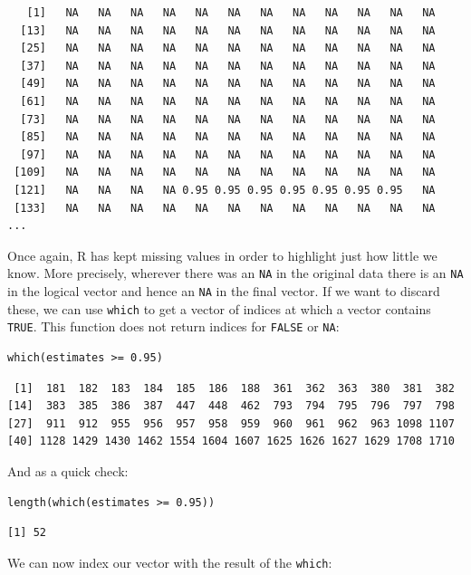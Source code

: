\begin{lstlisting}
   [1]   NA   NA   NA   NA   NA   NA   NA   NA   NA   NA   NA   NA
  [13]   NA   NA   NA   NA   NA   NA   NA   NA   NA   NA   NA   NA
  [25]   NA   NA   NA   NA   NA   NA   NA   NA   NA   NA   NA   NA
  [37]   NA   NA   NA   NA   NA   NA   NA   NA   NA   NA   NA   NA
  [49]   NA   NA   NA   NA   NA   NA   NA   NA   NA   NA   NA   NA
  [61]   NA   NA   NA   NA   NA   NA   NA   NA   NA   NA   NA   NA
  [73]   NA   NA   NA   NA   NA   NA   NA   NA   NA   NA   NA   NA
  [85]   NA   NA   NA   NA   NA   NA   NA   NA   NA   NA   NA   NA
  [97]   NA   NA   NA   NA   NA   NA   NA   NA   NA   NA   NA   NA
 [109]   NA   NA   NA   NA   NA   NA   NA   NA   NA   NA   NA   NA
 [121]   NA   NA   NA   NA 0.95 0.95 0.95 0.95 0.95 0.95 0.95   NA
 [133]   NA   NA   NA   NA   NA   NA   NA   NA   NA   NA   NA   NA
...
\end{lstlisting}

Once again,
R has kept missing values in order to highlight just how little we know.
More precisely,
wherever there was an \texttt{NA} in the original data
there is an \texttt{NA} in the logical vector
and hence an \texttt{NA} in the final vector.
If we want to discard these,
we can use \texttt{which} to get a vector of indices at which a vector contains \texttt{TRUE}.
This function does not return indices for \texttt{FALSE} or \texttt{NA}:

\begin{lstlisting}
which(estimates >= 0.95)
\end{lstlisting}

\begin{lstlisting}
 [1]  181  182  183  184  185  186  188  361  362  363  380  381  382
[14]  383  385  386  387  447  448  462  793  794  795  796  797  798
[27]  911  912  955  956  957  958  959  960  961  962  963 1098 1107
[40] 1128 1429 1430 1462 1554 1604 1607 1625 1626 1627 1629 1708 1710
\end{lstlisting}

\noindent
And as a quick check:

\begin{lstlisting}
length(which(estimates >= 0.95))
\end{lstlisting}

\begin{lstlisting}
[1] 52
\end{lstlisting}

We can now index our vector with the result of the \texttt{which}:

